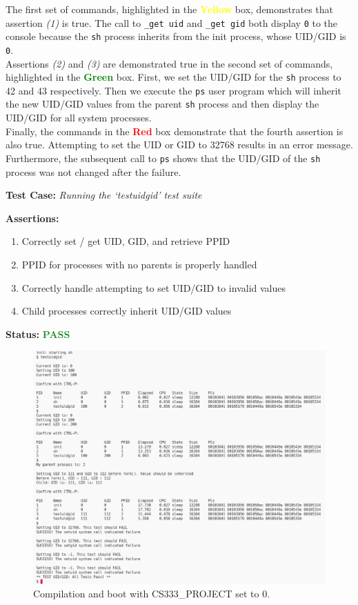 \documentclass[11pt,letterpaper]{report}
\newcommand{\code}[1]{\colorbox{codegray}{\texttt{#1}}}
\begin{document}
{  The first set of commands, highlighted in the \textcolor{Yellow}{\textbf{Yellow}} box, 
  demonstrates that assertion \emph{(1)} is true. The call to \code{\_get uid} 
  and \code{\_get gid} both display \code{0} to the console because the \code{sh} process inherits from the
  init process, whose UID/GID is \code{0}. \\
  \indent Assertions \emph{(2)} and \emph{(3)} are demonstrated true in the second set of commands,
  highlighted in the \textcolor{Green}{\textbf{Green}} box. First, we set the UID/GID for 
  the \code{sh} process to 42 and 43 respectively. Then we execute the \code{ps} user program
  which will inherit the new UID/GID values from the parent \code{sh} process and then display
  the UID/GID for all system processes. \\
  \indent Finally, the commands in the \textcolor{Red}{\textbf{Red}} box demonstrate that the
  fourth assertion is also true. Attempting to set the UID or GID to 32768 results in an error
  message. Furthermore, the subsequent call to \code{ps} shows that the UID/GID of the \code{sh}
  process was not changed after the failure. 

  \noindent\textbf{Test Case:} \emph{Running the `testuidgid' test suite}
  
  \noindent\textbf{Assertions:}
  \begin{enumerate}[]
  \item Correctly set / get UID, GID, and retrieve PPID
  \item PPID for processes with no parents is properly handled
  \item Correctly handle attempting to set UID/GID to invalid values
  \item Child processes correctly inherit UID/GID values
  \end{enumerate}  
  
  \noindent\textbf{Status:} \textcolor{ForestGreen}{\textbf{PASS}}
  
  \begin{figure}[h!]
	\centering
	\includegraphics[width=1\linewidth]{testuidgid.png}
	\caption[img]{Compilation and boot with CS333\_PROJECT set to 0.}
	\label{fig:P1compileP0-1}
  \end{figure}

}
\end{document}
